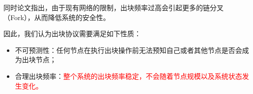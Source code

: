 同时论文\cite{sompolinsky2015secure}指出，由于现有网络的限制，出块频率过高会引起更多的链分叉（Fork），从而降低系统的安全性。

因此，我们认为出块协议需要满足如下性质：

\begin{itemize}
	\item 不可预测性：任何节点在执行出块操作前无法预知自己或者其他节点是否会成为出块节点；
	\item 合理出块频率：\textcolor{red}{整个系统的出块频率稳定，不会随着节点规模以及系统状态发生变化。}
\end{itemize}













